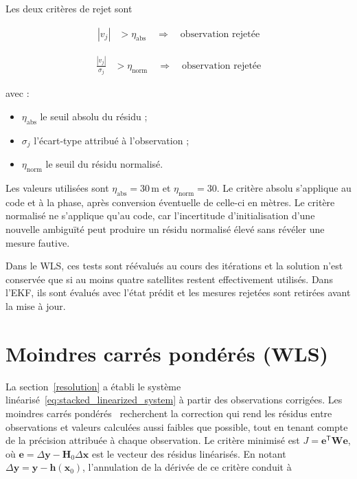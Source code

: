 Les deux critères de rejet sont

\begin{align}
|v_j|
&>\eta_{\mathrm{abs}} \quad\Longrightarrow\quad
\text{observation rejetée}
\end{align}

\begin{align}
\frac{|v_j|}{\sigma_j}
&>\eta_{\mathrm{norm}} \quad\Longrightarrow\quad
\text{observation rejetée}
\label{eq:residual_thresholds}
\end{align}

avec :

\begin{itemize}
    \item $\eta_{\mathrm{abs}}$ le seuil absolu du résidu ;
    \item $\sigma_j$ l'écart-type attribué à l'observation ;
    \item $\eta_{\mathrm{norm}}$ le seuil du résidu normalisé.
\end{itemize}

Les valeurs utilisées sont $\eta_{\mathrm{abs}}=30\,\mathrm{m}$ et
$\eta_{\mathrm{norm}}=30$. Le critère absolu s'applique au code et à la phase,
après conversion éventuelle de celle-ci en mètres. Le critère normalisé ne
s'applique qu'au code, car
l'incertitude d'initialisation d'une nouvelle ambiguïté peut produire un résidu
normalisé élevé sans révéler une mesure fautive.

Dans le WLS, ces tests sont réévalués au cours des itérations et la solution
n'est conservée que si au moins quatre satellites restent effectivement
utilisés. Dans l'EKF, ils sont évalués avec l'état prédit et les mesures
rejetées sont retirées avant la mise à jour.

\section{Moindres carrés pondérés (WLS)}
\label{sec:wls}

La section~\ref{resolution} a établi le système
linéarisé~\eqref{eq:stacked_linearized_system} à partir des observations
corrigées. Les moindres carrés pondérés~\cite{verhagen2017least} recherchent la correction qui rend les résidus
entre observations et valeurs calculées aussi faibles que possible, tout en
tenant compte de la précision attribuée à chaque observation. Le critère
minimisé est $J=\mathbf e^{\mathsf T}\mathbf W\mathbf e$, où
$\mathbf e=\Delta\mathbf y-\mathbf H_0\Delta\mathbf x$ est le vecteur des
résidus linéarisés. En notant
$\Delta\mathbf y=\mathbf y-\mathbf h(\mathbf x_0)$, l'annulation de la dérivée
de ce critère conduit à

